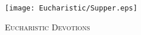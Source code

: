 \fancyhead[RE,LO]{}\fancyhead[RO,LE]{}
\fancyhead[C]{}
\thispagestyle{empty}
{}

\begin{figure}[H]
    \centering
    \texttt{[image: Eucharistic/Supper.eps]}
    \caption{\textsc{\Huge{Eucharistic Devotions}}}
\end{figure}